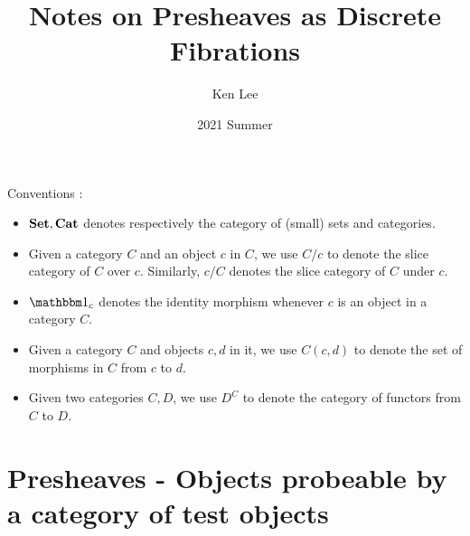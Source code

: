 \documentclass{article}
\begin{document}
\title{Notes on Presheaves as Discrete Fibrations}

\author{Ken Lee}
\date{2021 Summer}
\maketitle
\tableofcontents


Conventions : 
\begin{itemize}
  \item $\mathbf{Set}, \mathbf{Cat}$ denotes respectively the category of (small)
  sets and categories.
  \item Given a category $C$ and an object $c$ in $C$,
  we use $C / c$ to denote the slice category of $C$ over $c$.
  Similarly, $c / C$ denotes the slice category of $C$ under $c$.
  \item $\id{c}$ denotes the identity morphism whenever $c$ is an object in
  a category $C$.
  \item Given a category $C$ and objects $c, d$ in it,
  we use $C(c,d)$ to denote the set of morphisms in $C$ from $c$ to $d$.
  \item Given two categories $C, D$, we use $D^C$ to denote
  the category of functors from $C$ to $D$.
\end{itemize}

\section{Presheaves - Objects probeable by a category of test objects}
\end{document}
